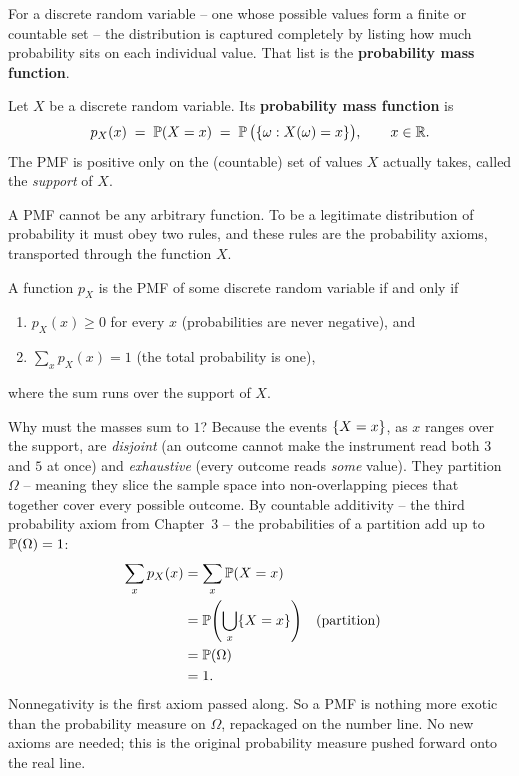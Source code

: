 For a discrete random variable -- one whose possible values form a finite or countable
set -- the distribution is captured completely by listing how much probability sits on
each individual value. That list is the \textbf{probability mass function}.

\begin{definition}
\label{ch06:def-pmf}
Let $X$ be a discrete random variable. Its \textbf{probability mass function} is
\[
  p_X(x) \;=\; \P(X = x) \;=\; \P\big(\set{\omega : X(\omega) = x}\big),
  \qquad x \in \R.
\]
The PMF is positive only on the (countable) set of values $X$ actually takes, called
the \emph{support} of $X$.
\end{definition}

A PMF cannot be any arbitrary function. To be a legitimate distribution of probability it
must obey two rules, and these rules are the probability axioms, transported
through the function $X$.

\begin{proposition}
\label{ch06:prop-valid-pmf}
A function $p_X$ is the PMF of some discrete random variable if and only if
\begin{enumerate}
  \item $p_X(x) \ge 0$ for every $x$ (probabilities are never negative), and
  \item $\displaystyle\sum_{x} p_X(x) = 1$ (the total probability is one),
\end{enumerate}
where the sum runs over the support of $X$.
\end{proposition}

\begin{whybox}
Why must the masses sum to $1$? Because the events $\set{X = x}$, as $x$ ranges over
the support, are \emph{disjoint} (an outcome cannot make the instrument read both $3$
and $5$ at once) and \emph{exhaustive} (every outcome reads \emph{some} value). They
partition $\Omega$ -- meaning they slice the sample space into non-overlapping pieces
that together cover every possible outcome. By countable additivity -- the third
probability axiom from Chapter~3 -- the probabilities of a partition add up to
$\P(\Omega) = 1$:
\begin{align*}
  \sum_x p_X(x) &= \sum_x \P(X = x) \\
  &= \P\!\left(\bigcup_x \set{X=x}\right) &&\text{(partition)} \\
  &= \P(\Omega) \\
  &= 1.
\end{align*}
Nonnegativity is the first axiom passed along. So a PMF is nothing more
exotic than the probability measure on $\Omega$, repackaged on the number line. No new
axioms are needed; this is the original probability measure pushed forward onto
the real line.
\end{whybox}

